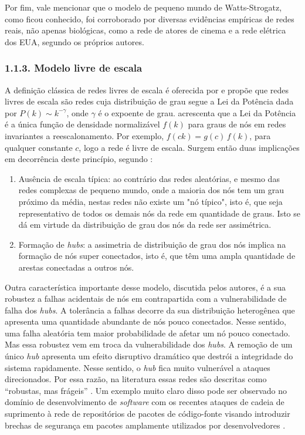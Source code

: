 \documentclass[12pt,oneside,a4paper,brazil,sumario=tradicional]{abntex2}
\begin{document}
Por fim, vale mencionar que o modelo de pequeno mundo de Watts-Strogatz, como ficou conhecido, foi corroborado por diversas evidências empíricas de redes reais, não apenas biológicas, como a rede de atores de cinema e a rede elétrica dos EUA, segundo os próprios autores.

\subsubsection*{1.1.3. Modelo livre de escala}
A definição clássica de redes livres de escala é oferecida por  e propõe que redes livres de escala são redes cuja distribuição de grau segue a Lei da Potência dada por $P(k) \sim k^{-\gamma}$, onde $\gamma$ é o expoente de grau.  acrescenta que a Lei da Potência é a única função de densidade normalizável $f(k)$ para graus de nós em redes invariantes a reescalonamento. Por exemplo, $f(ck) = g(c)\,f(k)$, para qualquer constante $c$, logo a rede é livre de escala. Surgem então duas implicações em decorrência deste princípio, segundo :

\begin{enumerate}
  \item Ausência de escala típica: ao contrário das redes aleatórias, e mesmo das redes complexas de pequeno mundo, onde a maioria dos nós tem um grau próximo da média, nestas redes não existe um "nó típico", isto é, que seja representativo de todos os demais nós da rede em quantidade de graus. Isto se dá em virtude da distribuição de grau dos nós da rede ser assimétrica.
  \item Formação de \textit{hubs}: a assimetria de distribuição de grau dos nós implica na formação de nós super conectados, isto é, que têm uma ampla quantidade de arestas conectadas a outros nós.
\end{enumerate}
Outra característica importante desse modelo, discutida pelos autores, é a sua robustez a falhas acidentais de nós em contrapartida com a vulnerabilidade de falha dos \textit{hubs}. A tolerância a falhas decorre da sua distribuição heterogênea que apresenta uma quantidade abundante de nós pouco conectados. Nesse sentido, uma falha aleatória tem maior probabilidade de afetar um nó pouco conectado. Mas essa robustez vem em troca da vulnerabilidade dos \textit{hubs}. A remoção de um único \textit{hub} apresenta um efeito disruptivo dramático que destrói a integridade do sistema rapidamente. Nesse sentido, o \textit{hub }fica muito vulnerável a ataques direcionados. Por essa razão, na literatura essas redes são descritas como “robustas, mas frágeis” \cite{wang2003, newman2003, serafino2021}. Um exemplo muito claro disso pode ser observado no domínio de desenvolvimento de \textit{software }com os recentes ataques de cadeia de suprimento \cite{thompson1984} à rede de repositórios de pacotes de código-fonte visando introduzir brechas de segurança em pacotes amplamente utilizados por desenvolvedores \cite{saayman2026, dholakia2026}.
\end{document}
